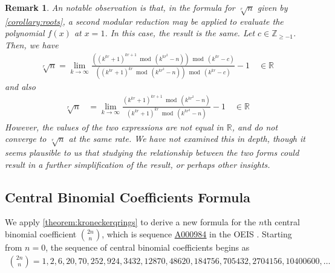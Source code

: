 \documentclass[11pt,reqno]{article}
\theoremstyle{plain}
\newtheorem{remark}{Remark}
\theoremstyle{definition}
\newcommand{\seqnum}[1]{\href{https://oeis.org/#1}{\rm \underline{#1}}}
\begin{document}
\begin{remark}
An notable observation is that, in the formula for $\sqrt[r]{n}$ given by \cref{corollary:roots}, a second modular reduction may be applied to evaluate the polynomial $f(x)$ at $x=1$. In this case, the result is the same. Let $c \in \mathbb{Z}_{\geq -1}$. Then, we have
\begin{align*}
\sqrt[r]{n} = \lim_{k\rightarrow\infty}
\frac{((k^{kr} + 1)^{kr+1} \bmod{(k^{kr^2}-n)}) \bmod{(k^{kr}-c)}}
    {((k^{kr} + 1)^{kr} \bmod{ (k^{kr^2}-n)}) \bmod{(k^{kr}-c)}} - 1  \quad \in \mathbb{R}
\end{align*}
and also
\begin{align*}
\sqrt[r]{n} &= \lim_{k\rightarrow\infty}
    \frac{(k^{kr} + 1)^{kr+1} \bmod{(k^{kr^2}-n)}}
    {(k^{kr} + 1)^{kr} \bmod{ (k^{kr^2}-n)}} - 1  \quad \in \mathbb{R}
\end{align*}
However, the values of the two expressions are not equal in $\mathbb{R}$, and do not converge to $\sqrt[r]{n}$ at the same rate. We have not examined this in depth, though it seems plausible to us that studying the relationship between the two forms could result in a further simplification of the result, or perhaps other insights.
\end{remark}

\subsection{Central Binomial Coefficients Formula}
We apply \cref{theorem:kroneckerqrings} to derive a new formula for the $n$th central binomial coefficient $\binom{2n}{n}$, which is sequence \seqnum{A000984} in the OEIS \cite{A000984}. Starting from $n=0$, the sequence of central binomial coefficients begins as
\begin{align*}
    \binom{2n}{n} = 1, 2, 6, 20, 70, 252, 924, 3432, 12870, 48620, 184756, 705432, 2704156, 10400600, \ldots
\end{align*}
\end{document}

